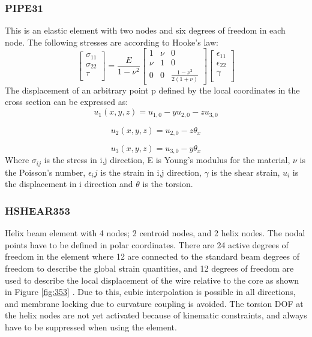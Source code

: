 \subsubsection{PIPE31}
This is an elastic element with two nodes and six degrees of freedom in each node. The following stresses are according to Hooke's law:
\begin{equation}
    \begin{bmatrix}
       \sigma_{11}\\[0.3em]
       \sigma_{22}\\[0.3em]
        \tau\\[0.3em]
     \end{bmatrix}= \frac{E}{1-\nu^2}  \begin{bmatrix}
       1 & \nu & 0           \\[0.3em]
       \nu & 1      & 0 \\[0.3em]
       0           & 0& \frac{1-\nu^2}{2(1+\nu)}
     \end{bmatrix} \begin{bmatrix}
       \epsilon_{11}\\[0.3em]
       \epsilon_{22}\\[0.3em]
        \gamma\\[0.3em]
     \end{bmatrix}
\end{equation}
The displacement of an arbitrary point p defined by the local coordinates in the cross section can be expressed as:
\begin{equation}
    u_1(x,y,z)=u_{1,0}-yu_{2,0}-zu_{3,0}
\end{equation}

\begin{equation}
    u_2(x,y,z)=u_{2,0}-z\theta_x
\end{equation}

\begin{equation}
    u_3(x,y,z)=u_{3,0}-y\theta_x
\end{equation}
\noindent Where $\sigma_{ij}$ is the stress in i,j direction, E is Young's modulus for the material, $\nu$ is the Poisson's number, $\epsilon_ij$ is the strain in i,j direction, $\gamma$ is the shear strain, $u_i$ is the displacement in i direction and $\theta$ is the torsion.  
\subsubsection{HSHEAR353}
Helix beam element with 4 nodes; 2 centroid nodes, and 2 helix nodes. The nodal points have to be defined in polar coordinates. There are 24 active degrees of freedom in the element where 12 are connected to the standard beam degrees of freedom to describe the global strain quantities, and 12 degrees of freedom are used to describe the local displacement of the wire relative to the core as shown in Figure \ref{fig:353} . Due to this, cubic interpolation is possible in all directions, and membrane locking due to curvature coupling is avoided. The torsion DOF at the helix nodes are not yet activated because of kinematic constraints, and always have to be suppressed when using the element.

